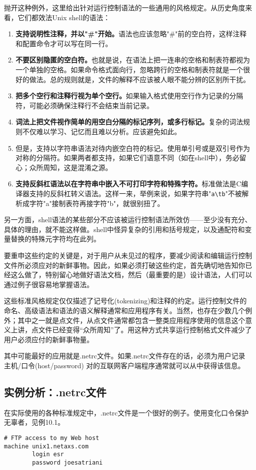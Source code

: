 \documentclass[12pt,oneside]{ctexbook}
\begin{document}
\begin{common-format}
抛开这种例外，这里给出针对运行控制语法的一些通用的风格规定。从历史角度来看，它们都效法Unix shell的语法：
\begin{enumerate}
\item \textbf{支持说明性注释，并以"\#{}"开始。}语法也应该忽略"\#{}"前的空白符，这样注释和配置命令才可以写在同一行。
\item \textbf{不要区别隐匿的空白符。}也就是说，在语法上把一连串的空格和制表符都视为一个单独的空格。如果命令格式面向行，忽略跨行的空格和制表符就是一个很好的做法。总的规则就是，文件的解释不应该被人眼不能分辨的区别所干扰。
\item \textbf{把多个空行和注释行视为单个空行。}如果输入格式使用空行作为记录的分隔符，可能必须确保注释行不会结束当前记录。
\item \textbf{词法上把文件视作简单的用空白分隔的标记序列，或多行标记。}复杂的词法规则不仅难以学习、记忆而且难以分析。应该避免如此。
\item 但是，支持以字符串语法对待内嵌空白符的标记。使用单引号或是双引号作为对称的分隔符。如果两者都支持，如果它们语意不同（如在shell中），务必留心；众所周知，这是混淆之源。
\item \textbf{支持反斜杠语法以在字符串中嵌入不可打印字符和特殊字符。}标准做法是C编译器支持的反斜杠转义语法。这样一来，举例来说，如果字符串"\verb+a\tb+"不被解析成字符"a"接制表符再接字符"b"，就很别扭了。
\end{enumerate}

另一方面，shell语法的某些部分不应该被运行控制语法所效仿——至少没有充分、具体的理由，就不能这样做。shell中怪异复杂的引用和括号规定，以及通配符和变量替换的特殊元字符均在此列。

要重申这些约定的关键是，对于用户从未见过的程序，要减少阅读和编辑运行控制文件所必须应对的新鲜事物。因此，如果必须打破这些约定，首先确切地告知你已经这么做了，特别留心地做好语法文档，然后（最重要的是）设计语法，人们可以通过例子很容易地掌握语法。

这些标准风格规定仅仅描述了记号化(tokenizing)和注释的约定。运行控制文件的命名、高级语法和语法的语义解释通常和应用程序有关。当然，也存在少数几个例外；其中之一就是点文件，从点文件通常都包含一整类应用程序使用的信息这个意义上讲，点文件已经变得“众所周知”了。用这种方式共享运行控制格式文件减少了用户必须应付的新鲜事物量。

其中可能最好的应用就是.netrc文件。如果.netrc文件存在的话，必须为用户记录主机/口令(host/password) 对的互联网客户端程序通常就可以从中获得该信息。


\subsection{实例分析：.netrc文件}
在实际使用的各种标准规定中，.netrc文件是一个很好的例子。使用变化口令保护无辜者，见例10.1。
\begin{Verbatim}[label=例10.1 .netrc例子]
# FTP access to my Web host
machine unix1.netaxs.com
        login esr
        password joesatriani


\end{Verbatim}
\end{common-format}
\end{document}
